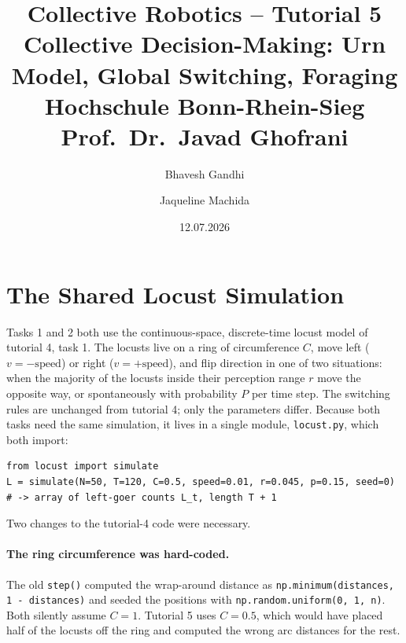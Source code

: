 \documentclass[12pt, a4paper]{article}
\title{
    \vspace{-1cm}
    \textbf{Collective Robotics -- Tutorial 5}\\[0.3em]
    \large Collective Decision-Making: Urn Model, Global Switching, Foraging\\[0.5em]
    \normalsize Hochschule Bonn-Rhein-Sieg\\
    Prof.\ Dr.\ Javad Ghofrani
}
\author{Bhavesh Gandhi \and Jaqueline Machida}
\date{12.07.2026}
\begin{document}
\maketitle
\thispagestyle{fancy}
\tableofcontents
\newpage

\section{The Shared Locust Simulation}

Tasks 1 and 2 both use the continuous-space, discrete-time locust model of
tutorial 4, task 1.  The locusts live on a ring of circumference $C$, move left
($v = -\text{speed}$) or right ($v = +\text{speed}$), and flip direction in one
of two situations: when the majority of the locusts inside their perception
range $r$ move the opposite way, or spontaneously with probability $P$ per time
step.  The switching rules are unchanged from tutorial 4; only the parameters
differ.  Because both tasks need the same simulation, it lives in a single
module, \texttt{locust.py}, which both import:

\begin{lstlisting}
from locust import simulate
L = simulate(N=50, T=120, C=0.5, speed=0.01, r=0.045, p=0.15, seed=0)
# -> array of left-goer counts L_t, length T + 1
\end{lstlisting}

Two changes to the tutorial-4 code were necessary.

\paragraph{The ring circumference was hard-coded.}
The old \texttt{step()} computed the wrap-around distance as
\texttt{np.minimum(distances, 1 - distances)} and seeded the positions with
\texttt{np.random.uniform(0, 1, n)}.  Both silently assume $C = 1$.  Tutorial 5
uses $C = 0.5$, which would have placed half of the locusts off the ring and
computed the wrong arc distances for the rest.
\end{document}
